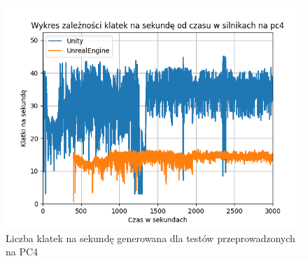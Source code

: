 \documentclass[12pt,twoside]{article}
\begin{document}
\begin{figure}[ht]
    \centering
    \includegraphics[width=16cm]{figures/FPSPlots/pc4searchedDataName.png}
    \caption{Liczba klatek na sekundę generowana dla testów przeprowadzonych na PC4}
    \label{Fig:PC4Tests}
\end{figure}      
\end{document}
